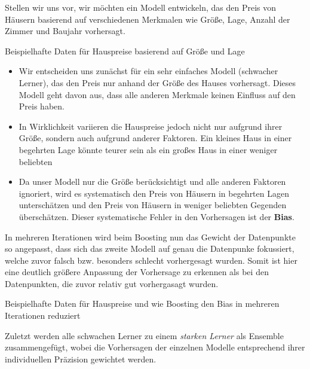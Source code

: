Stellen wir uns vor, wir möchten ein Modell entwickeln, das den Preis von
Häusern basierend auf verschiedenen Merkmalen wie Größe, Lage, Anzahl der
Zimmer und Baujahr vorhersagt.

\begin{table}[h]
    \centering
    
    \caption{Beispielhafte Daten für Hauspreise basierend auf Größe und Lage}
\end{table}

\begin{itemize}
    \item Wir entscheiden uns zunächst für ein sehr einfaches Modell (schwacher Lerner),
          das den Preis nur anhand der Größe des Hauses vorhersagt.
          Dieses Modell geht davon aus, dass alle anderen Merkmale keinen
          Einfluss auf den Preis haben.
    \item In Wirklichkeit variieren die Hauspreise jedoch nicht nur aufgrund
          ihrer Größe, sondern auch aufgrund anderer Faktoren. Ein kleines Haus in einer
          begehrten Lage könnte teurer sein als ein großes Haus in einer weniger beliebten
    \item Da unser Modell nur die Größe berücksichtigt und alle anderen Faktoren ignoriert,
          wird es systematisch den Preis von Häusern in begehrten Lagen unterschätzen und den Preis
          von Häusern in weniger beliebten Gegenden überschätzen. Dieser systematische Fehler in den
          Vorhersagen ist der \textbf{Bias}.
\end{itemize}

In mehreren Iterationen wird beim Boosting nun das Gewicht der Datenpunkte so angepasst, dass sich das
zweite Modell auf genau die Datenpunke fokussiert, welche zuvor falsch bzw. besonders schlecht vorhergesagt wurden.
Somit ist hier eine deutlich größere Anpassung der Vorhersage zu erkennen als bei den Datenpunkten, die zuvor
relativ gut vorhergasagt wurden.

\begin{table}
    \centering
    
    \caption{Beispielhafte Daten für Hauspreise und wie Boosting den Bias in mehreren Iterationen reduziert}
\end{table}
Zuletzt werden alle schwachen Lerner zu einem \emph{starken Lerner} als Ensemble zusammengefügt, wobei die Vorhersagen
der einzelnen Modelle entsprechend ihrer individuellen Präzision gewichtet werden.